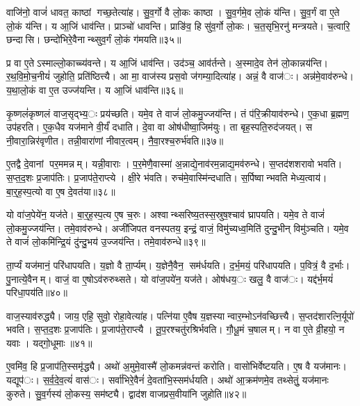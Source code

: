 वाजि॑नो॒ वाजं॑ धावत॒ काष्ठां गच्छ॒तेत्या॑ह। सु॒व॒र्गो वै लो॒कः काष्ठा। सु॒व॒र्गमे॒व लो॒कं य॑न्ति। सु॒व॒र्गं वा ए॒ते लो॒कं य॑न्ति। य आ॒जिं धाव॑न्ति। प्राञ्चो॑ धावन्ति। प्राङि॑व॒ हि सु॑व॒र्गो लो॒कः। च॒त॒सृभि॒रनु॑ मन्त्रयते। च॒त्वारि॒ छन्दासि। छन्दो॑भिरे॒वैनान्थ्सुव॒र्गं लो॒कं ग॑मयति॥३५॥

प्र वा ए॒तेऽस्माल्लो॒काच्च्य॑वन्ते। य आ॒जिं धाव॑न्ति। उद॑ञ्च॒ आव॑र्तन्ते। अ॒स्मादे॒व तेन॑ लो॒कान्नय॑न्ति। र॒थ॒वि॒मो॒च॒नीयं॑ जुहोति॒ प्रति॑ष्ठित्त्यै। आ मा॒ वाज॑स्य प्रस॒वो ज॑गम्या॒दित्या॑ह। अन्नं॒ वै वाज॑ः। अन्न॑मे॒वाव॑रुन्धे। य॒था॒लो॒कं वा ए॒त उज्ज॑यन्ति। य आ॒जिं धाव॑न्ति॥३६॥

कृ॒ष्णलं॑कृष्णलं वाज॒सृद्भ्य॒ः प्रय॑च्छति। यमे॒व ते वाजं॑ लो॒कमु॒ज्जय॑न्ति। तं प॑रि॒क्रीयाव॑रुन्धे। ए॒क॒धा ब्र॒ह्मण॒ उप॑हरति। ए॒क॒धैव यज॑माने वी॒र्यं॑ दधाति। दे॒वा वा ओष॑धीष्वा॒जिम॑युः। ता बृह॒स्पति॒रुद॑जयत्। स नी॒वारा॒न्निर॑वृणीत। तन्नी॒वारा॑णां नीवार॒त्वम्। नै॒वा॒रश्च॒रुर्भ॑वति॥३७॥

ए॒तद्वै दे॒वानां पर॒ममन्नम्। यन्नी॒वाराः। प॒र॒मेणै॒वास्मा॑ अ॒न्नाद्ये॒नाव॑रम॒न्नाद्य॒मव॑रुन्धे। स॒प्तद॑शशरावो भवति। स॒प्त॒द॒शः प्र॒जाप॑तिः। प्र॒जाप॑ते॒राप्त्ये। क्षी॒रे भ॑वति। रुच॑मे॒वास्मि॑न्दधाति। स॒र्पिष्वान्भवति मेध्य॒त्वाय॑। बा॒र्॒ह॒स्प॒त्यो वा ए॒ष दे॒वत॑या॥३८॥

यो वा॑ज॒पेये॑न॒ यज॑ते। बा॒र्॒ह॒स्प॒त्य ए॒ष च॒रुः। अश्वान्थ्सरिष्य॒तस्स॒स्रुष॒श्चाव॑ घ्रापयति। यमे॒व ते वाजं॑ लो॒कमु॒ज्जय॑न्ति। तमे॒वाव॑रुन्धे। अजी॑जिपत वनस्पतय॒ इन्द्रं॒ वाजं॒ विमु॑च्यध्व॒मिति॑ दुन्दु॒भीन् विमु॑ञ्चति। यमे॒व ते वाजं॑ लो॒कमि॑न्द्रि॒यं दु॑न्दु॒भय॑ उ॒ज्जय॑न्ति। तमे॒वाव॑रुन्धे॥३९॥


ता॒र्प्यं यज॑मानं॒ परि॑धापयति। य॒ज्ञो वै ता॒र्प्यम्। य॒ज्ञेनै॒वैन॒ सम॑र्धयति। द॒र्भ॒मयं॒ परि॑धापयति। प॒वित्रं॒ वै द॒र्भाः। पु॒नात्ये॒वैनम्। वाजं॒ वा ए॒षोऽव॑रुरुथ्सते। यो वा॑ज॒पये॑न॒ यज॑ते। ओष॑धय॒ः खलु॒ वै वाज॑ः। यद्द॑र्भ॒मयं॑ परिधा॒पय॑ति॥४०॥

वाज॒स्याव॑रुद्ध्यै। जाय॒ एहि॒ सुवो॒ रोहा॒वेत्या॑ह। पत्नि॑या ए॒वैष य॒ज्ञस्यान्वार॒म्भोऽन॑वच्छित्त्यै। स॒प्तद॑शारत्नि॒र्यूपो॑ भवति। स॒प्त॒द॒शः प्र॒जाप॑तिः। प्र॒जाप॑ते॒राप्त्यै। तू॒प॒रश्चतु॑रश्रिर्भवति। गौ॒धू॒मं च॒षालम्। न वा ए॒ते व्री॒हयो॒ न यवाः। यद्गो॒धूमाः॥४१॥

ए॒वमि॑व॒ हि प्र॒जाप॑ति॒स्समृ॑द्ध्यै। अथो॑ अ॒मुमे॒वास्मै॑ लो॒कमन्न॑वन्तं करोति। वासो॑भिर्वेष्टयति। ए॒ष वै यज॑मानः। यद्यूप॑ः। स॒र्व॒दे॒व॒त्यं॑ वास॑ः। सर्वा॑भिरे॒वैनं॑ दे॒वता॑भि॒स्सम॑र्धयति। अथो॑ आ॒क्रम॑णमे॒व तथ्सेतुं॒ यज॑मानः कुरुते। सु॒व॒र्गस्य॑ लो॒कस्य॒ सम॑ष्ट्यै। द्वाद॑श वाजप्रस॒वीया॑नि जुहोति॥४२॥

